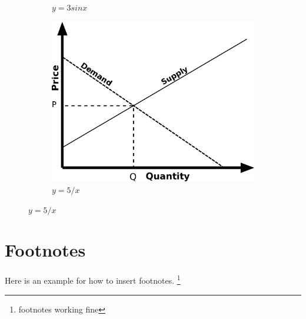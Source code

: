 \documentclass[Theme1]{{template_material/eurostat}}
\begin{document}
\begin{figure}[h]
\begin{subfigure}[b]{0.3\textwidth}
         \caption{$y=3sinx$}
         \label{fig:three sin x}
     \end{subfigure}
     \hfill
     \begin{subfigure}[b]{0.3\textwidth}
         \centering
         \includegraphics[width=\textwidth]{template_material/FiguresFiles/Simple_supply_and_demand.svg.png}
         \caption{$y=5/x$}
         \label{fig:five over x}
     \end{subfigure}
\end{figure}








\newpage %
\section{Footnotes}

Here is an example for how to insert footnotes. \footnote{footnotes working fine}
\end{document}
